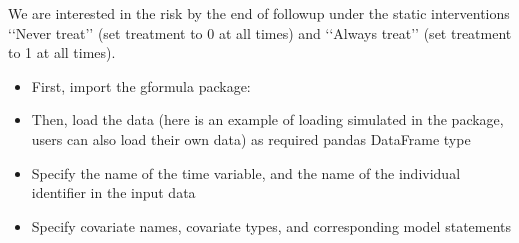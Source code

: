 \documentclass[letterpaper,10pt,english]{sphinxmanual}
\begin{document}
\sphinxAtStartPar
We are interested in the risk by the end of follow\sphinxhyphen{}up under the static interventions ‘‘Never treat’’ (set treatment
to 0 at all times) and ‘‘Always treat’’ (set treatment to 1 at all times).
\begin{itemize}
\item {} 
\sphinxAtStartPar
First, import the g\sphinxhyphen{}formula package:

\begin{sphinxVerbatim}[commandchars=\\\{\}]
 
   
\end{sphinxVerbatim}

\item {} 
\sphinxAtStartPar
Then, load the data (here is an example of loading simulated  in the package,
users can also load their own data) as required pandas DataFrame type

\begin{sphinxVerbatim}[commandchars=\\\{\}]
   
  
\end{sphinxVerbatim}

\item {} 
\sphinxAtStartPar
Specify the name of the time variable, and the name of the individual identifier in the input data

\begin{sphinxVerbatim}[commandchars=\\\{\}]
  
  
\end{sphinxVerbatim}

\item {} 
\sphinxAtStartPar
Specify covariate names, covariate types, and corresponding model statements


\end{itemize}
\end{document}
